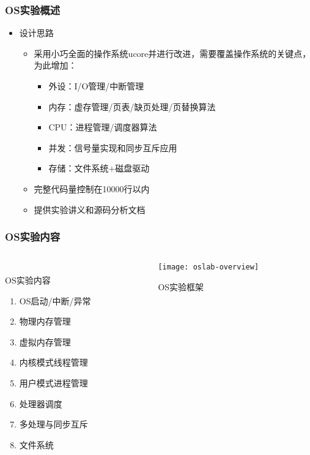 \begin{frame}

\frametitle{OS实验概述}

\begin{itemize}
\item 设计思路
    \begin{itemize}
    \item 采用小巧全面的操作系统ucore并进行改进，需要覆盖操作系统的关键点，为此增加：
    \begin{itemize}
        \item 外设：I/O管理/中断管理
        \item 内存：虚存管理/页表/缺页处理/页替换算法
        \item CPU：进程管理/调度器算法
        \item 并发：信号量实现和同步互斥应用
        \item 存储：文件系统+磁盘驱动
    \end{itemize}
    \item 完整代码量控制在10000行以内
    \item 提供实验讲义和源码分析文档
    \end{itemize}
\end{itemize}

\end{frame}


\begin{frame}
	
	\frametitle{OS实验内容}

	\begin{columns}[t]
    \begin{column}{.35\linewidth}
     \\
     OS实验内容
     
	\begin{enumerate}
	    \item OS启动/中断/异常
		\item 物理内存管理
		\item 虚拟内存管理	
		\item 内核模式线程管理
		\item 用户模式进程管理
		\item 处理器调度
		\item 多处理与同步互斥
		\item 文件系统
	\end{enumerate}
	\end{column}
	
	\begin{column}{.7\linewidth}
	\begin{figure}
		\centering
		\texttt{[image: oslab-overview]}
		\caption{OS实验框架}
	\end{figure}
	\end{column}
	\end{columns}
\end{frame}


